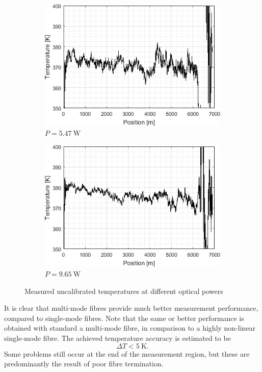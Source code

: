 \documentclass{standalone}
\begin{document}
\begin{figure}[h]
	\centering
	\begin{subfigure}[b]{0.49\textwidth}
		\includegraphics[width=\textwidth]{mmf_power_temperatures-01.png}
		\caption{$P = \SI{5.47}{\watt}$}
	\end{subfigure}
	\begin{subfigure}[b]{0.49\textwidth}
		\includegraphics[width=\textwidth]{mmf_power_temperatures-2-02.png}
		\caption{$P = \SI{9.65}{\watt}$}
	\end{subfigure}
	\caption{Measured uncalibrated temperatures at different optical powers}
	\label{fig:mmf_power_temperatures}
\end{figure}
It is clear that multi-mode fibres provide much better measurement performance, compared to single-mode fibres. Note that the same or better performance is obtained with standard a multi-mode fibre, in comparison to a highly non-linear single-mode fibre. The achieved temperature accuracy is estimated to be 
\begin{equation}
\varDelta T < \SI{5}{\kelvin} \textrm{.}
\end{equation}
Some problems still occur at the end of the measurement region, but these are predominantly the result of poor fibre termination. \\
\end{document}
